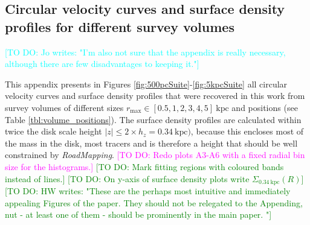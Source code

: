 \documentclass[iop,revtex4,numberedappendix,appendixfloats]{emulateapj}
\newcommand{\RM}{{\sl RoadMapping}}
\newcommand{\Wilma}[1]{\textcolor{Magenta}{#1}}
\newcommand{\HW}[1]{\textcolor{Green}{#1}}
\newcommand{\Jo}[1]{\textcolor{Cyan}{#1}}
\begin{document}

{}


\begin{appendix}

\section{Circular velocity curves and surface density profiles for different survey volumes} \label{app:circsurf}

\Jo{[TO DO: Jo writes: "I'm also not sure that the appendix is really necessary, although there are few disadvantages to keeping it."]}

This appendix presents in Figures \ref{fig:500pcSuite}-\ref{fig:5kpcSuite} all circular velocity curves and surface density profiles that were recovered in this work from survey volumes of different sizes $r_\text{max} \in [0.5,1,2,3,4,5]~\text{kpc}$ and positions (see Table \ref{tbl:volume_positions}). The surface density profiles are calculated within twice the disk scale height $|z| \leq 2\times h_z=0.34~\text{kpc})$, because this encloses most of the mass in the disk, most tracers and is therefore a height that should be well constrained by \RM{}. \Wilma{[TO DO: Redo plots A3-A6 with a fixed radial bin size for the histograms.]} \HW{[TO DO: Mark fitting regions with coloured bands instead of lines.]} \HW{[TO DO: On y-axis of surface density plots write $\Sigma_{0.34~\text{kpc}}(R)$]} \HW{[TO DO: HW writes: "These are the perhaps most intuitive and immediately appealing Figures of the paper. They should not be relegated to the Appending, nut - at least one of them - should be prominently in the main paper. "]}


\end{appendix}
\end{document}
